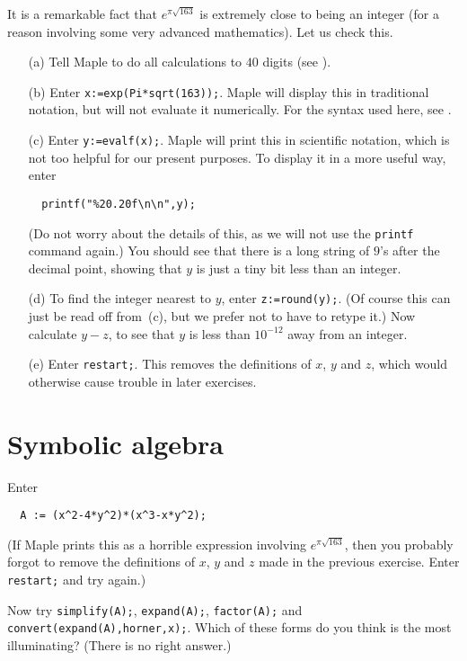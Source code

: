 \documentclass[a4paper,10pt]{amsbook}
\numberwithin{example}{chapter}
\begin{document}
\begin{exercise}\label{ex-near-int}
 It is a remarkable fact that $e^{\pi\sqrt{163}}$ is extremely close
 to being an integer (for a reason involving some very advanced
 mathematics).  Let us check this. 
 \begin{itemize}
  \item[(a)] Tell Maple to do all calculations to $40$
   digits (see \note{\NOTEdigits}).
  \item[(b)] Enter \verb~x:=exp(Pi*sqrt(163));~.  Maple will
   display this in traditional notation, but will not evaluate it
   numerically.  For the syntax used here, see
   \note{\NOTEcolonequals,\NOTEexp,\NOTEpi,\NOTEsqrt}. 
  \item[(c)] Enter \verb~y:=evalf(x);~.  Maple will print this in
   scientific notation, which is not too helpful for our present
   purposes.  To display it in a more useful way, enter
\begin{verbatim}
  printf("%20.20f\n\n",y);
\end{verbatim}
   (Do not worry about the details of this, as we will not
   use the \verb~printf~ command again.)  You should see
   that there is a long string of $9$'s after the decimal
   point, showing that $y$ is just a tiny bit less than an
   integer. 
  \item[(d)] To find the integer nearest to $y$, enter
   \verb~z:=round(y);~.  (Of course this can just be read off
   from~(c), but we prefer not to have to retype it.)  Now calculate
   $y-z$, to see that $y$ is less than $10^{-12}$ away from an
   integer. 
  \item[(e)] Enter \verb~restart;~.  This removes the definitions of
   $x$, $y$ and $z$, which would otherwise cause trouble in later
   exercises. 
 \end{itemize}
\end{exercise}

\section{Symbolic algebra}

\begin{exercise}\label{ex-horner}
 Enter
\begin{verbatim}
  A := (x^2-4*y^2)*(x^3-x*y^2);
\end{verbatim}
 (If Maple prints this as a horrible expression involving
 $e^{\pi\sqrt{163}}$, then you probably forgot to remove the
 definitions of $x$, $y$ and $z$ made in the previous exercise.  Enter
 \verb~restart;~ and try again.) 
 
 Now try \verb~simplify(A);~, \verb~expand(A);~, \verb~factor(A);~ and
 \verb~convert(expand(A),horner,x);~.  Which of these forms do you think is
 the most illuminating?  (There is no right answer.) 
\end{exercise}
\end{document}
